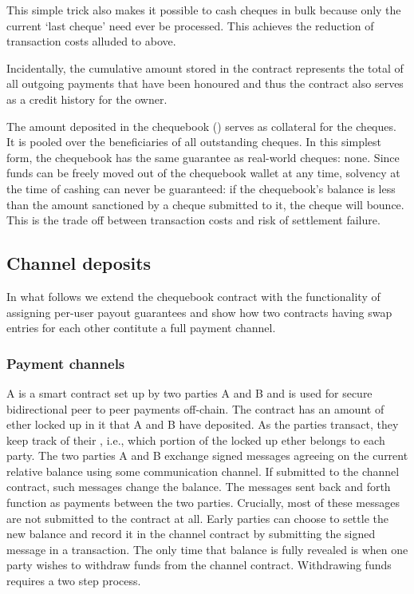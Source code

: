 This simple trick also makes it possible to cash cheques in bulk because only the current `last cheque' need ever be processed. This achieves the reduction of transaction costs alluded to above.

Incidentally, the cumulative amount stored in the contract represents the total of all outgoing payments that have been honoured and thus the contract also serves as a credit history for the owner.

The amount deposited in the chequebook () serves as collateral for the cheques. It is pooled over the beneficiaries of all outstanding cheques.
In this simplest form, the chequebook has the same guarantee as real-world cheques: none. Since funds can be freely moved out of the chequebook wallet at any time, solvency at the time of cashing can never be guaranteed: if the chequebook's balance is less than the amount sanctioned by a cheque submitted to it, the cheque will bounce. This is the trade off between transaction costs and risk of settlement failure.





\subsection{Channel deposits}

In what follows we extend the chequebook contract with the functionality of assigning per-user payout guarantees and show how two contracts having swap entries for each other contitute a full payment channel. 

\subsubsection{Payment channels}

A  is a smart contract set up by two parties A and B and is used for secure bidirectional peer to peer payments off-chain. The contract has an amount of ether locked up in it that A and B have deposited. As the parties transact, they keep track of their , i.e., which portion of the locked up ether belongs to each party. The two parties A and B exchange signed messages agreeing on the current relative balance using some communication channel. If submitted to the channel contract, such messages change the balance. The messages sent back and forth function as payments between the two parties. Crucially, most of these messages are not submitted to the contract at all. Early parties can choose to settle the new balance and record it in the channel contract by submitting the signed message in a transaction. The only time that balance is fully revealed is when one party wishes to withdraw funds from the channel contract. Withdrawing funds requires a two step process.

